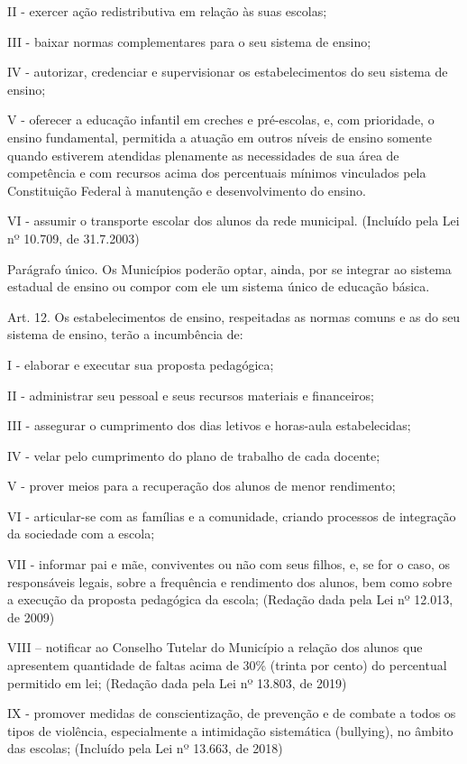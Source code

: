 \documentclass[
]{book}
\begin{document}
II - exercer ação redistributiva em relação às suas escolas;

III - baixar normas complementares para o seu sistema de ensino;

IV - autorizar, credenciar e supervisionar os estabelecimentos do seu sistema de ensino;

V - oferecer a educação infantil em creches e pré-escolas, e, com prioridade, o ensino fundamental, permitida a atuação em outros níveis de ensino somente quando estiverem atendidas plenamente as necessidades de sua área de competência e com recursos acima dos percentuais mínimos vinculados pela Constituição Federal à manutenção e desenvolvimento do ensino.

VI - assumir o transporte escolar dos alunos da rede municipal. (Incluído pela Lei nº 10.709, de 31.7.2003)

Parágrafo único. Os Municípios poderão optar, ainda, por se integrar ao sistema estadual de ensino ou compor com ele um sistema único de educação básica.

Art. 12. Os estabelecimentos de ensino, respeitadas as normas comuns e as do seu sistema de ensino, terão a incumbência de:

I - elaborar e executar sua proposta pedagógica;

II - administrar seu pessoal e seus recursos materiais e financeiros;

III - assegurar o cumprimento dos dias letivos e horas-aula estabelecidas;

IV - velar pelo cumprimento do plano de trabalho de cada docente;

V - prover meios para a recuperação dos alunos de menor rendimento;

VI - articular-se com as famílias e a comunidade, criando processos de integração da sociedade com a escola;

VII - informar pai e mãe, conviventes ou não com seus filhos, e, se for o caso, os responsáveis legais, sobre a frequência e rendimento dos alunos, bem como sobre a execução da proposta pedagógica da escola; (Redação dada pela Lei nº 12.013, de 2009)

VIII -- notificar ao Conselho Tutelar do Município a relação dos alunos que apresentem quantidade de faltas acima de 30\% (trinta por cento) do percentual permitido em lei; (Redação dada pela Lei nº 13.803, de 2019)

IX - promover medidas de conscientização, de prevenção e de combate a todos os tipos de violência, especialmente a intimidação sistemática (bullying), no âmbito das escolas; (Incluído pela Lei nº 13.663, de 2018)
\end{document}
